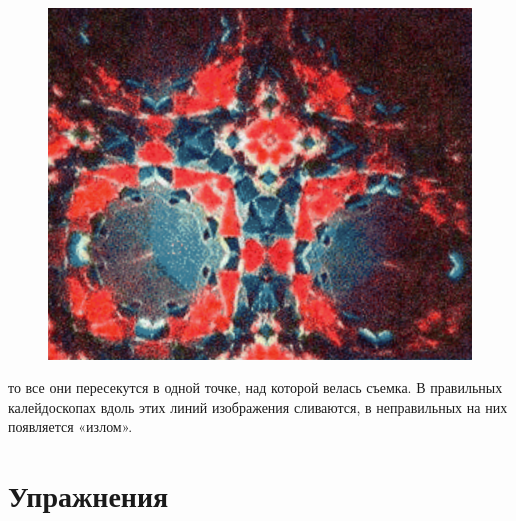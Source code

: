 \begin{minipage}{0.6\textwidth}
    \begin{figure}[H]
        \setcounter{figure}{13}
        \centering
        \includegraphics[width=0.9\columnwidth]{img/1.png}
        \caption{}
    \end{figure}
    то все они пересекутся в одной точке, над которой велась съемка. В правильных калейдоскопах вдоль этих линий изображения сливаются, в неправильных на них появляется «излом».
    \titleformat{\section}{\filcenter}{}{}{}
    \section*{Упражнения}
    \begin{enumerate}


\end{enumerate}
\end{minipage}
